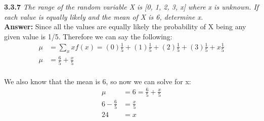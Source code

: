 \documentclass[11pt]{article}
\begin{document}
\noindent \textbf{3.3.7} \emph{The range of the random variable X is [0, 1, 2, 3, x] where x is unknown. If each value is equally likely and the mean of X is 6, determine x. }
\\\textbf{Answer: } Since all the values are equally likely the probability of X being any given value is 1/5. Therefore we can say the following:
\begin{equation}
\begin{split}
\mu &=\sum_{x} xf(x) = (0)\frac{1}{5} + (1)\frac{1}{5} + (2)\frac{1}{5} + (3)\frac{1}{5} + x\frac{1}{5} \\
\mu &= \frac{6}{5} + \frac{x}{5} \\
\end{split}
\end{equation}

We also know that the mean is 6, so now we can solve for x:
\begin{equation}
\begin{split}
\mu &= 6 = \frac{6}{5} + \frac{x}{5} \\
6 - \frac{6}{5} &= \frac{x}{5} \\
24 &= x
\end{split}
\end{equation}
\end{document}

